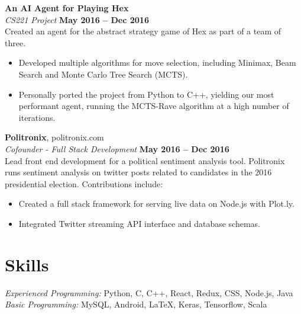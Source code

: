 \documentclass[margin,line]{resume-template}
\begin{document}
\begin{resume}
   \textbf{An AI Agent for Playing Hex} \vspace{2mm}\\\vspace{1mm}%
    \textsl{CS221 Project} \hfill \textbf{May 2016 -- Dec 2016}\\
    Created an agent for the abstract strategy game of Hex as part of a team of three.
    \begin{itemize}
    	\item Developed multiple algorithms for move selection, including Minimax, Beam Search and Monte Carlo Tree Search (MCTS).
        \item Personally ported the project from Python to C++, yielding our most performant agent, running the MCTS-Rave algorithm at a high number of iterations.
    \end{itemize}
    
    \textbf{Politronix}, politronix.com \vspace{2mm}\\\vspace{1mm}%
    \textsl{Cofounder - Full Stack Development} \hfill \textbf{May 2016 -- Dec 2016}\\
    Lead front end development for a political sentiment analysis tool. Politronix runs sentiment analysis on twitter posts related to candidates in the 2016 presidential election. Contributions include:
    \begin{itemize}
        \item Created a full stack framework for serving live data on Node.js with Plot.ly.
        \item Integrated Twitter streaming API interface and database schemas.
    \end{itemize}

    \section{\mysidestyle Skills}

    \emph{Experienced Programming:} Python, C, C++, React, Redux, CSS, Node.js, Java \\
    \emph{Basic Programming:} MySQL, Android, \LaTeX, Keras, Tensorflow, Scala
\end{resume}
\end{document}
